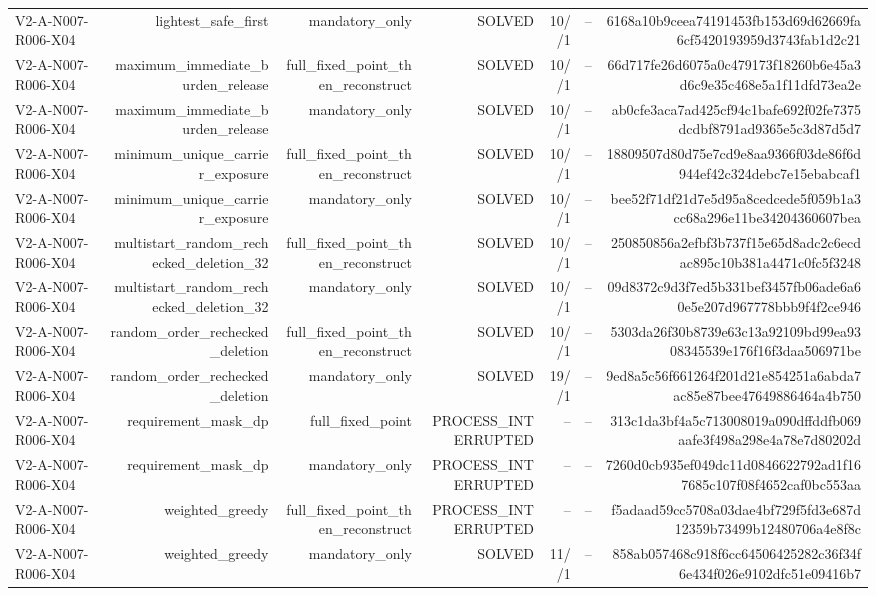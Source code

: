 {\begin{longtable}{lrrrrrr}
V2-A-N007-R006-X04 & lightest\_safe\_first & mandatory\_only & SOLVED & 10//1 & -- & 6168a10b9ceea74191453fb153d69d62669fa6cf5420193959d3743fab1d2c21 \\
V2-A-N007-R006-X04 & maximum\_immediate\_burden\_release & full\_fixed\_point\_then\_reconstruct & SOLVED & 10//1 & -- & 66d717fe26d6075a0c479173f18260b6e45a3d6c9e35c468e5a1f11dfd73ea2e \\
V2-A-N007-R006-X04 & maximum\_immediate\_burden\_release & mandatory\_only & SOLVED & 10//1 & -- & ab0cfe3aca7ad425cf94c1bafe692f02fe7375dcdbf8791ad9365e5c3d87d5d7 \\
V2-A-N007-R006-X04 & minimum\_unique\_carrier\_exposure & full\_fixed\_point\_then\_reconstruct & SOLVED & 10//1 & -- & 18809507d80d75e7cd9e8aa9366f03de86f6d944ef42c324debc7e15ebabcaf1 \\
V2-A-N007-R006-X04 & minimum\_unique\_carrier\_exposure & mandatory\_only & SOLVED & 10//1 & -- & bee52f71df21d7e5d95a8cedcede5f059b1a3cc68a296e11be34204360607bea \\
V2-A-N007-R006-X04 & multistart\_random\_rechecked\_deletion\_32 & full\_fixed\_point\_then\_reconstruct & SOLVED & 10//1 & -- & 250850856a2efbf3b737f15e65d8adc2c6ecdac895c10b381a4471c0fc5f3248 \\
V2-A-N007-R006-X04 & multistart\_random\_rechecked\_deletion\_32 & mandatory\_only & SOLVED & 10//1 & -- & 09d8372c9d3f7ed5b331bef3457fb06ade6a60e5e207d967778bbb9f4f2ce946 \\
V2-A-N007-R006-X04 & random\_order\_rechecked\_deletion & full\_fixed\_point\_then\_reconstruct & SOLVED & 10//1 & -- & 5303da26f30b8739e63c13a92109bd99ea9308345539e176f16f3daa506971be \\
V2-A-N007-R006-X04 & random\_order\_rechecked\_deletion & mandatory\_only & SOLVED & 19//1 & -- & 9ed8a5c56f661264f201d21e854251a6abda7ac85e87bee47649886464a4b750 \\
V2-A-N007-R006-X04 & requirement\_mask\_dp & full\_fixed\_point & PROCESS\_INTERRUPTED & -- & -- & 313c1da3bf4a5c713008019a090dffddfb069aafe3f498a298e4a78e7d80202d \\
V2-A-N007-R006-X04 & requirement\_mask\_dp & mandatory\_only & PROCESS\_INTERRUPTED & -- & -- & 7260d0cb935ef049dc11d0846622792ad1f167685c107f08f4652caf0bc553aa \\
V2-A-N007-R006-X04 & weighted\_greedy & full\_fixed\_point\_then\_reconstruct & PROCESS\_INTERRUPTED & -- & -- & f5adaad59cc5708a03dae4bf729f5fd3e687d12359b73499b12480706a4e8f8c \\
V2-A-N007-R006-X04 & weighted\_greedy & mandatory\_only & SOLVED & 11//1 & -- & 858ab057468c918f6cc64506425282c36f34f6e434f026e9102dfc51e09416b7 \\

\end{longtable}}
